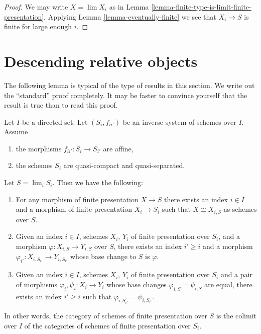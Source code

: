 \begin{proof}
We may write $X = \lim X_i$ as in
Lemma \ref{lemma-finite-type-is-limit-finite-presentation}.
Applying Lemma \ref{lemma-eventually-finite} we see that $X_i \to S$
is finite for large enough $i$.
\end{proof}








\section{Descending relative objects}
\label{section-descending-relative}

\noindent
The following lemma is typical of the type of results in this section.
We write out the ``standard'' proof completely. It may be faster to
convince yourself that the result is true than to read this proof.

\begin{lemma}
\label{lemma-descend-finite-presentation}
Let $I$ be a directed set.
Let $(S_i, f_{ii'})$ be an inverse system of schemes over $I$.
Assume
\begin{enumerate}
\item the morphisms $f_{ii'} : S_i \to S_{i'}$ are affine,
\item the schemes $S_i$ are quasi-compact and quasi-separated.
\end{enumerate}
Let $S = \lim_i S_i$. Then we have the following:
\begin{enumerate}
\item For any morphism of finite presentation $X \to S$
there exists an index $i \in I$ and a morphism of finite
presentation $X_i \to S_i$ such that $X \cong X_{i, S}$ as
schemes over $S$.
\item Given an index $i \in I$, schemes
$X_i$, $Y_i$ of finite presentation over $S_i$, and a morphism
$\varphi : X_{i, S} \to Y_{i, S}$ over $S$, there exists an index
$i' \geq i$ and a morphism
$\varphi_{i'} : X_{i, S_{i'}} \to Y_{i, S_{i'}}$
whose base change to $S$ is $\varphi$.
\item Given an index $i \in I$, schemes $X_i$, $Y_i$ of finite presentation
over $S_i$ and a pair of morphisms $\varphi_i, \psi_i : X_i \to Y_i$
whose base changes $\varphi_{i, S} = \psi_{i, S}$ are equal,
there exists an index $i' \geq i$ such that
$\varphi_{i, S_{i'}} = \psi_{i, S_{i'}}$.
\end{enumerate}
In other words, the category of schemes of finite presentation over
$S$ is the colimit over $I$ of the categories of schemes of finite
presentation over $S_i$.
\end{lemma}

